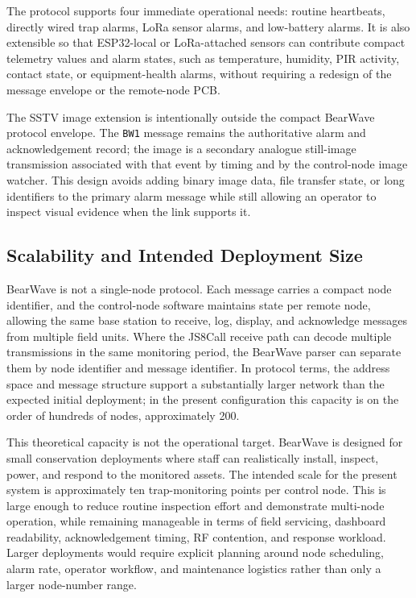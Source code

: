 \documentclass[acmsmall,screen]{acmart}
\begin{document}
The protocol supports four immediate operational needs: routine heartbeats, directly wired trap alarms, LoRa sensor alarms, and low-battery alarms. It is also extensible so that ESP32-local or LoRa-attached sensors can contribute compact telemetry values and alarm states, such as temperature, humidity, PIR activity, contact state, or equipment-health alarms, without requiring a redesign of the message envelope or the remote-node PCB.

The SSTV image extension is intentionally outside the compact BearWave protocol envelope. The \texttt{BW1} message remains the authoritative alarm and acknowledgement record; the image is a secondary analogue still-image transmission associated with that event by timing and by the control-node image watcher. This design avoids adding binary image data, file transfer state, or long identifiers to the primary alarm message while still allowing an operator to inspect visual evidence when the link supports it.

\subsection{Scalability and Intended Deployment Size}
BearWave is not a single-node protocol. Each message carries a compact node identifier, and the control-node software maintains state per remote node, allowing the same base station to receive, log, display, and acknowledge messages from multiple field units. Where the JS8Call receive path can decode multiple transmissions in the same monitoring period, the BearWave parser can separate them by node identifier and message identifier. In protocol terms, the address space and message structure support a substantially larger network than the expected initial deployment; in the present configuration this capacity is on the order of hundreds of nodes, approximately 200.

This theoretical capacity is not the operational target. BearWave is designed for small conservation deployments where staff can realistically install, inspect, power, and respond to the monitored assets. The intended scale for the present system is approximately ten trap-monitoring points per control node. This is large enough to reduce routine inspection effort and demonstrate multi-node operation, while remaining manageable in terms of field servicing, dashboard readability, acknowledgement timing, RF contention, and response workload. Larger deployments would require explicit planning around node scheduling, alarm rate, operator workflow, and maintenance logistics rather than only a larger node-number range.
\end{document}
